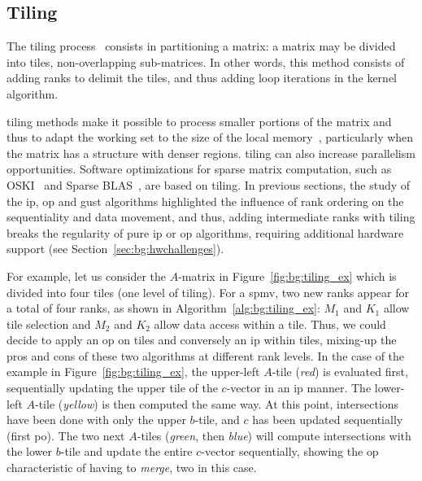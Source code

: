 \subsection{Tiling}
\label{sec:bg:tiling}

The \gls{tiling} process~\cite{Grunbaum1987_Tiling} consists in partitioning a matrix: a matrix may be divided into \glspl{tile}, non-overlapping sub-matrices.
In other words, this method consists of adding \glspl{rank} to delimit the \glspl{tile}, and thus adding loop iterations in the kernel algorithm.

\Gls{tiling} methods make it possible to process smaller portions of the matrix and thus to adapt the working set to the size of the local memory~\cite{Lam1991_Tiling, Wilkinson2023_Tiling}, particularly when the matrix has a structure with denser regions.
\Gls{tiling} can also increase parallelism opportunities.
Software optimizations for sparse matrix computation, such as OSKI~\cite{Vuduc2005} and Sparse BLAS~\cite{Duff2002_SparseBLAS}, are based on \gls{tiling}.
In previous sections, the study of the \acrshort{ip}, \acrshort{op} and \acrshort{gust} algorithms highlighted the influence of \gls{rank} ordering on the sequentiality and data movement, and thus, adding intermediate \glspl{rank} with \gls{tiling} breaks the regularity of pure \acrshort{ip} or \acrshort{op} algorithms, requiring additional hardware support (see Section~\ref{sec:bg:hwchallenges}).

For example, let us consider the $A$-matrix in Figure~\ref{fig:bg:tiling_ex} which is divided into four \glspl{tile} (one level of \gls{tiling}).
For a \acrshort{spmv}, two new \glspl{rank} appear for a total of four \glspl{rank}, as shown in Algorithm~\ref{alg:bg:tiling_ex}: $M_1$ and $K_1$ allow \gls{tile} selection and $M_2$ and $K_2$ allow data access within a \gls{tile}.
Thus, we could decide to apply an \acrshort{op} on \glspl{tile} and conversely an \acrshort{ip} within \glspl{tile}, mixing-up the pros and cons of these two algorithms at different \gls{rank} levels.
In the case of the example in Figure~\ref{fig:bg:tiling_ex}, the upper-left $A$-\gls{tile} (\textit{red}) is evaluated first, sequentially updating the upper \gls{tile} of the $c$-vector in an \acrshort{ip} manner.
The lower-left $A$-\gls{tile} (\textit{yellow}) is then computed the same way.
At this point, \glspl{intersection} have been done with only the upper $b$-\gls{tile}, and $c$ has been updated sequentially (first \acrshort{po}).
The two next $A$-\glspl{tile} (\textit{green}, then \textit{blue}) will compute \glspl{intersection} with the lower $b$-\gls{tile} and update the entire $c$-vector sequentially, showing the \acrshort{op} characteristic of having  to \emph{merge}, two in this case.

